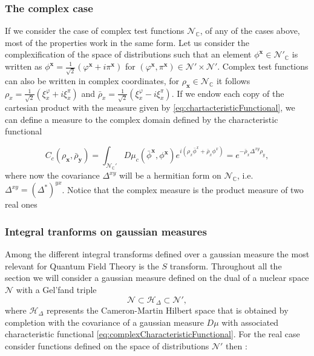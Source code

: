 \documentclass[12pt]{article}%
\begin{document}
\subsubsection{The complex case}
If we consider the case of complex test functions $\mathcal{N}_\mathbb{C}$, of any of the cases above, most of the properties work in the same form.  Let us consider the complexification of the space of distributions such that  an element $\phi^{\mathbf{x}}\in\mathcal{N}'_\mathbb{C}$ is written as $\phi^{\mathbf{x}}=\frac{1}{\sqrt{2}}(\varphi^{\mathbf{x}}+i\pi^{\mathbf{x}})$ for $(\varphi^{\mathbf{x}},\pi^\mathbf{x})\in \mathcal{N}'\times \mathcal{N}'$. Complex test functions can also be written in complex coordinates, for $\rho_{\mathbf{x}}\in\mathcal{N}_\mathbb{C}$ it follows  $\rho_x=\frac{1}{\sqrt{2}}(\xi^{\varphi}_x+i\xi^{\pi}_x)$ and $\bar\rho_x=\frac{1}{\sqrt{2}}(\xi^{\varphi}_x-i\xi^{\pi}_x)$. If we endow each copy of the cartesian product with the measure given by \eqref{eq:chartacteristicFunctional},  we can define a measure to the complex domain  defined by the characteristic functional  

\begin{equation}
\label{eq:complexCharacteristicFunctional}
C_c(\rho_{\mathbf{x}},\bar\rho_{\mathbf{y}})=\int_{\mathcal{N}_{\mathbb{C}}'}D\mu_c(\bar \phi^{\mathbf{x}}, \phi^{\mathbf{x}}) e^{i({\rho_x\bar{\phi}^x+\bar\rho_x{\phi}^x})} =e^{-\bar{\rho}_x\Delta^{xy}\rho_y},
\end{equation}
where now the covariance $\Delta^{xy}$ will be a hermitian form on $\mathcal{N}_\mathbb{C}$, i.e. $\Delta^{xy}=(\Delta^*)^{yx}$. 
Notice that the complex measure is the product measure of two real ones

\subsubsection{Integral tranforms on gaussian measures}
Among the different integral transforms defined over a gaussian measure the most relevant for Quantum Field Theory is the $S$ transform. Throughout all the section we will consider a gaussian measure defined on the dual of a nuclear space $\mathcal{N}$ with a Gel'fand triple
$$
\mathcal{N}\subset \mathcal{H}_\Delta \subset \mathcal{N}',
$$
where $\mathcal{H}_\Delta$ represents the Cameron-Martin Hilbert space that is obtained by completion with the covariance of a gaussian measure $D\mu$ with associated characteristic functional \eqref{eq:complexCharacteristicFunctional}. For the real case consider functions defined on the space of distributions $\mathcal{N}'$ then :
\end{document}

